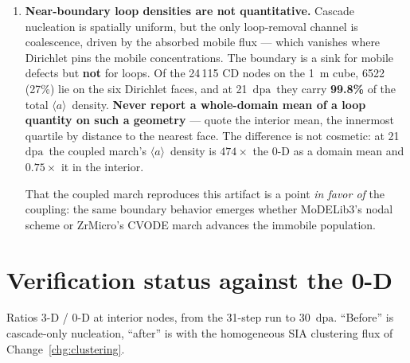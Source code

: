 \documentclass[11pt,a4paper]{article}
\newcommand{\dpa}{\ensuremath{\mathrm{dpa}}}
\newcommand{\aloop}{\ensuremath{\langle a\rangle}}
\newcounter{chg}
\begin{document}
\begin{enumerate}
\item \textbf{Near-boundary loop densities are not quantitative.} Cascade
nucleation is spatially uniform, but the only loop-removal channel is
coalescence, driven by the absorbed mobile flux --- which vanishes where
Dirichlet pins the mobile concentrations. The boundary is a sink for mobile
defects but \textbf{not} for loops. Of the 24\,115 CD nodes on the 1~\textmu m
cube, 6522 (27\%) lie on the six Dirichlet faces, and at 21~\dpa\ they carry
\textbf{99.8\%} of the total \aloop\ density. \textbf{Never report a
whole-domain mean of a loop quantity on such a geometry} --- quote the interior
mean, the innermost quartile by distance to the nearest face. The difference is
not cosmetic: at 21~\dpa\ the coupled march's \aloop\ density is $474\times$ the
0-D as a domain mean and $0.75\times$ it in the interior.

That the coupled march reproduces this artifact is a point \emph{in favor of}
the coupling: the same boundary behavior emerges whether MoDELib3's nodal
scheme or ZrMicro's CVODE march advances the immobile population.

\end{enumerate}

\section*{Verification status against the 0-D}

Ratios 3-D / 0-D at interior nodes, from the 31-step run to 30~\dpa. ``Before''
is cascade-only nucleation, ``after'' is with the homogeneous SIA clustering
flux of Change~\ref{chg:clustering}.
\end{document}
